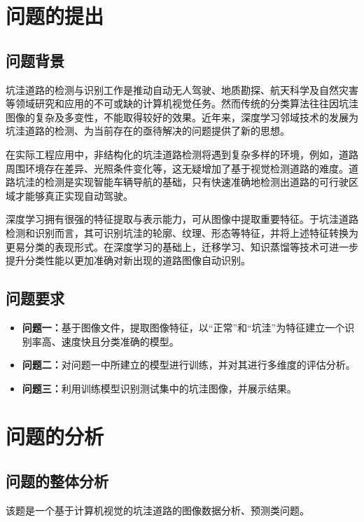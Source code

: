 \documentclass{MathorCupmodeling}
\begin{document}
	\begin{abstract}
		{\heiti 最后}，本文对所建立的模型的优缺点进行了中肯的评价、提出了模型的改进措施以及对模型进行了一定推广。
	\end{abstract}

	\pagestyle{empty}
	\tableofcontents
	\newpage
	\pagestyle{fancy}

	\setcounter{page}{1}
	\section{问题的提出}
	\subsection{问题背景}
	坑洼道路的检测与识别工作是推动自动无人驾驶、地质勘探、航天科学及自然灾害等领域研究和应用的不可或缺的计算机视觉任务。然而传统的分类算法往往因坑洼图像的复杂及多变性，不能取得较好的效果。近年来，深度学习邻域技术的发展为坑洼道路的检测、为当前存在的亟待解决的问题提供了新的思想。

	在实际工程应用中，非结构化的坑洼道路检测将遇到复杂多样的环境，例如，道路周围环境存在差异、光照条件变化等，这无疑增加了基于视觉检测道路的难度\textcolor{blue}{\cite{曹江华}}。道路坑洼的检测是实现智能车辆导航的基础，只有快速准确地检测出道路的可行驶区域才能够真正实现自动驾驶。

	深度学习拥有很强的特征提取与表示能力，可从图像中提取重要特征。于坑洼道路检测和识别而言，其可识别坑洼的轮廓、纹理、形态等特征，并将上述特征转换为更易分类的表现形式。在深度学习的基础上，迁移学习、知识蒸馏等技术可进一步提升分类性能以更加准确对新出现的道路图像自动识别。
	\subsection{问题要求}
	\begin{itemize}
		\item \textbf{问题一：}基于图像文件，提取图像特征，以“正常”和“坑洼”为特征建立一个识别率高、速度快且分类准确的模型。
		\item \textbf{问题二：}对问题一中所建立的模型进行训练，并对其进行多维度的评估分析。
		\item \textbf{问题三：}利用训练模型识别测试集中的坑洼图像，并展示结果。
	\end{itemize}
	\section{问题的分析}
	\subsection{问题的整体分析}
	该题是一个基于计算机视觉的坑洼道路的图像数据分析、预测类问题。
\end{document}

